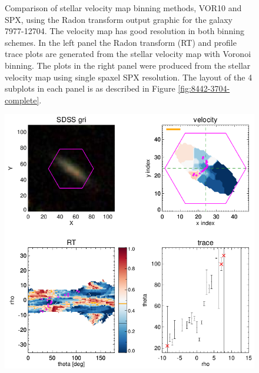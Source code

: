 \begin{figure}
    \caption[Comparison of velocity map binning schemes for a high resolution map]{Comparison of stellar velocity map binning methods, VOR10 and SPX, using the Radon transform output graphic for the galaxy 7977-12704. The velocity map has good resolution in both binning schemes. In the left panel the Radon transform (RT) and profile trace plots are generated from the stellar velocity map with Voronoi binning. The plots in the right panel were produced from the stellar velocity map using single spaxel SPX resolution. The layout of the 4 subplots in each panel is as described in Figure \ref{fig:8442-3704-complete}.}
    \label{fig:binning-comparison}
\end{figure}

\begin{figure}
    \centering
    \includegraphics[width=\columnwidth]{images/RadonPlots/RT-SNIPS-NEW/8993-6104-VOR10-MILESHC-MILESHC-1-SNIP.png}

\end{figure}
